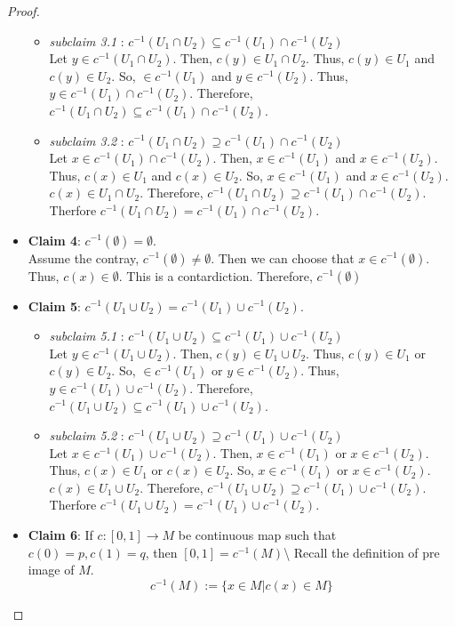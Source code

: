 \documentclass[
]{book}
\providecommand{\tightlist}{%
  \setlength{\itemsep}{0pt}\setlength{\parskip}{0pt}}
\theoremstyle{definition}
\theoremstyle{definition}
\theoremstyle{definition}
\theoremstyle{definition}
\theoremstyle{remark}
\begin{document}
\begin{proof}
\begin{itemize}
  \begin{itemize}
  \tightlist
  \item
    \emph{subclaim 3.1} : \(c^{-1}(U_1\cap U_2)\subseteq c^{-1}(U_1)\cap c^{-1}(U_2)\)\\
    Let \(y\in c^{-1}(U_1\cap U_2)\). Then, \(c(y)\in U_1\cap U_2\). Thus, \(c(y)\in U_1\) and \(c(y)\in U_2\). So, \(\in c^{-1}(U_1)\) and \(y\in c^{-1}(U_2)\). Thus, \(y \in c^{-1}(U_1)\cap c^{-1}(U_2)\). Therefore, \(c^{-1}(U_1\cap U_2)\subseteq c^{-1}(U_1)\cap c^{-1}(U_2)\).
  \item
    \emph{subclaim 3.2} : \(c^{-1}(U_1\cap U_2)\supseteq c^{-1}(U_1)\cap c^{-1}(U_2)\)\\
    Let \(x\in c^{-1}(U_1)\cap c^{-1}(U_2)\). Then, \(x \in c^{-1}(U_1)\) and \(x\in c^{-1}(U_2)\). Thus, \(c(x)\in U_1\) and \(c(x)\in U_2\). So, \(x\in c^{-1}(U_1)\) and \(x\in c^{-1}(U_2)\). \(c(x)\in U_1\cap U_2\). Therefore, \(c^{-1}(U_1\cap U_2)\supseteq c^{-1}(U_1)\cap c^{-1}(U_2)\).
    Therfore \(c^{-1}(U_1\cap U_2)= c^{-1}(U_1)\cap c^{-1}(U_2)\).
  \end{itemize}
\item
  \textbf{Claim 4}: \(c^{-1}(\emptyset)=\emptyset\).\\
  Assume the contray, \(c^{-1}(\emptyset)\neq \emptyset\). Then we can choose that \(x\in c^{-1}(\emptyset)\). Thus, \(c(x)\in\emptyset\). This is a contardiction. Therefore, \(c^{-1}(\emptyset)\)
\item
  \textbf{Claim 5}: \(c^{-1}(U_1\cup U_2)= c^{-1}(U_1)\cup c^{-1}(U_2)\).\\

  \begin{itemize}
  \tightlist
  \item
    \emph{subclaim 5.1} : \(c^{-1}(U_1\cup U_2)\subseteq c^{-1}(U_1)\cup c^{-1}(U_2)\)\\
    Let \(y\in c^{-1}(U_1\cup U_2)\). Then, \(c(y)\in U_1\cup U_2\). Thus, \(c(y)\in U_1\) or \(c(y)\in U_2\). So, \(\in c^{-1}(U_1)\) or \(y\in c^{-1}(U_2)\). Thus, \(y \in c^{-1}(U_1)\cup c^{-1}(U_2)\). Therefore, \(c^{-1}(U_1\cup U_2)\subseteq c^{-1}(U_1)\cup c^{-1}(U_2)\).
  \item
    \emph{subclaim 5.2} : \(c^{-1}(U_1\cup U_2)\supseteq c^{-1}(U_1)\cup c^{-1}(U_2)\)\\
    Let \(x\in c^{-1}(U_1)\cup c^{-1}(U_2)\). Then, \(x \in c^{-1}(U_1)\) or \(x\in c^{-1}(U_2)\). Thus, \(c(x)\in U_1\) or \(c(x)\in U_2\). So, \(x\in c^{-1}(U_1)\) or \(x\in c^{-1}(U_2)\). \(c(x)\in U_1\cup U_2\). Therefore, \(c^{-1}(U_1\cup U_2)\supseteq c^{-1}(U_1)\cup c^{-1}(U_2)\).
    Therfore \(c^{-1}(U_1\cup U_2)= c^{-1}(U_1)\cup c^{-1}(U_2)\).
  \end{itemize}
\item
  \textbf{Claim 6}: If \(c:[0,1]\to M\) be continuous map such that \(c(0)=p,c(1)=q\), then \([0,1]=c^{-1}(M)\)\textbackslash{}
  Recall the definition of pre image of \(M\).
  \[c^{-1}(M):=\{x\in M | c(x)\in M\}\]


\end{itemize}
\end{proof}
\end{document}
